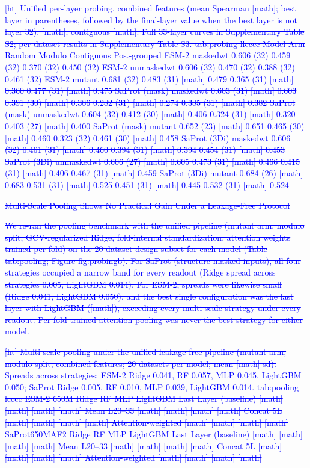 \documentclass[11pt,a4paper]{article}
\begin{document}
\textcolor{blue}{\sout{[ht]
Unified per-layer probing, combined features (mean Spearman
[math]; best layer in parentheses, followed by the final-layer value when the best
layer is not layer 32). [math]; contiguous [math]. Full 33-layer curves in
Supplementary Table S2; per-dataset results in Supplementary Table S3.
tab:probing
llcccc
Model Arm Random Modulo Contiguous Pos.-grouped 
ESM-2 maskedwt 0.606 (32) 0.459 (32) 0.370 (32) 0.450 (32) 
ESM-2 unmaskedwt 0.606 (32) 0.470 (32) 0.388 (32) 0.461 (32) 
ESM-2 mutant 0.681 (32) 0.483 (31) [math] 0.479 0.365 (31) [math] 0.360 0.477 (31) [math] 0.475 
SaProt (mask) maskedwt 0.603 (31) [math] 0.603 0.391 (30) [math] 0.386 0.282 (31) [math] 0.274 0.385 (31) [math] 0.382 
SaProt (mask) unmaskedwt 0.604 (32) 0.412 (30) [math] 0.406 0.324 (31) [math] 0.320 0.403 (27) [math] 0.400 
SaProt (mask) mutant 0.652 (23) [math] 0.651 0.465 (30) [math] 0.460 0.323 (32) 0.461 (30) [math] 0.458 
SaProt (3Di) maskedwt 0.606 (32) 0.461 (31) [math] 0.460 0.394 (31) [math] 0.394 0.454 (31) [math] 0.453 
SaProt (3Di) unmaskedwt 0.606 (27) [math] 0.605 0.473 (31) [math] 0.466 0.415 (31) [math] 0.406 0.467 (31) [math] 0.459 
SaProt (3Di) mutant 0.684 (26) [math] 0.683 0.531 (31) [math] 0.525 0.451 (31) [math] 0.445 0.532 (31) [math] 0.524}}

\textcolor{blue}{\sout{Multi-Scale Pooling Shows No Practical Gain Under a Leakage-Free Protocol}}

\textcolor{blue}{\sout{We re-ran the pooling benchmark with the unified pipeline (mutant arm, modulo
split, GCV-regularized Ridge, fold-internal standardization, attention weights trained
per fold) on the 20-dataset design subset for each model
(Table tab:pooling; Figure fig:probingb).
For SaProt (structure-masked inputs), all four strategies occupied a narrow band for
every readout (Ridge spread across strategies 0.005; LightGBM 0.014). For ESM-2,
spreads were likewise small (Ridge 0.041; LightGBM 0.050), and the best single
configuration was the last layer with LightGBM ([math]), exceeding every
multi-scale strategy under every readout. Per-fold-trained attention pooling was
never the best strategy for either model.}}

\textcolor{blue}{\sout{[ht]
Multi-scale pooling under the unified leakage-free pipeline (mutant
arm, modulo split, combined features; 20 datasets per model; mean [math] sd).
Spreads across strategies: ESM-2 Ridge 0.041, RF 0.057, MLP 0.045, LightGBM 0.050;
SaProt Ridge 0.005, RF 0.010, MLP 0.039, LightGBM 0.014.
tab:pooling
lcccc
ESM-2 650M Ridge RF MLP LightGBM 
Last Layer (baseline) [math] [math] [math] [math] 
Mean L20--33 [math] [math] [math] [math] 
Concat 5L [math] [math] [math] [math] 
Attention-weighted [math] [math] [math] [math] 
SaProt650MAF2 Ridge RF MLP LightGBM 
Last Layer (baseline) [math] [math] [math] [math] 
Mean L20--33 [math] [math] [math] [math] 
Concat 5L [math] [math] [math] [math] 
Attention-weighted [math] [math] [math] [math]}}
\end{document}
